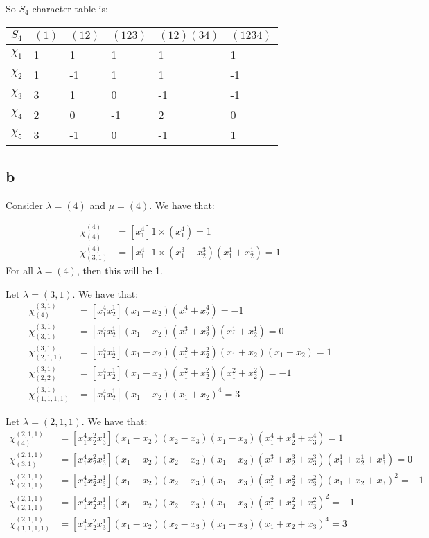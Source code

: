 \documentclass[]{article}
\begin{document}
So $S_4$ character table is:
\begin{table}[h!]
	\centering
	\begin{tabular}{|l|l|l|l|l|l|}
		\hline
		$S_4$    & $(1)$ & $(12)$ & $(123)$ & $(12)(34)$ & $(1234)$ \\ \hline
		$\chi_1$ & 1     & 1      & 1       & 1          & 1        \\ \hline
		$\chi_2$ & 1     & -1     & 1       & 1          & -1       \\ \hline
		$\chi_3$ & 3     & 1      & 0       & -1         & -1       \\ \hline
		$\chi_4$ & 2     & 0      & -1      & 2          & 0        \\ \hline
		$\chi_5$ & 3     & -1     & 0       & -1         & 1        \\ \hline
	\end{tabular}
\end{table}

\subsection*{b}
Consider $\lambda = (4)$ and $\mu = (4)$.
We have that:

\begin{align*}
	\chi^{(4)}_{(4)} &= [x_1^{4}] 1 \times (x_1^4) = 1\\
	\chi^{(4)}_{(3,1)} &= [x_1^{4}] 1 \times (x_1^3 + x_2^3)(x_1^1 + x_2^1) = 1
\end{align*}
For all $\lambda = (4)$, then this will be 1.

Let $\lambda = (3,1)$. We have that:
\begin{align*}
	\chi^{(3,1)}_{(4)} &= [x_1^4 x_2^1] (x_1 - x_2) (x_1^4 + x_2^4) = -1\\
	\chi^{(3,1)}_{(3,1)}&= [x_1^4 x_2^1] (x_1 - x_2) (x_1^3 + x_2^3)(x_1^1 + x_2^1) = 0\\
	\chi^{(3,1)}_{(2,1,1)}&= [x_1^4 x_2^1] (x_1 - x_2) (x_1^2 + x_2 ^2)(x_1 + x_2) (x_1 + x_2 ) = 1\\
	\chi^{(3,1)}_{(2,2)}&= [x_1^4 x_2^1] (x_1 - x_2) (x_1^2 + x_2 ^2)(x_1^2 + x_2^2 )  = -1\\
	\chi^{(3,1)}_{(1,1,1,1)}&= [x_1^4 x_2^1] (x_1 - x_2) (x_1 + x_2)^4 = 3
\end{align*}

Let $\lambda = (2,1,1)$. We have that:
\begin{align*}
	\chi^{(2,1,1)}_{(4)} &= [x_1^4 x_2^2 x_3^1](x_1 - x_2)(x_2 - x_3)(x_1 - x_3) (x_1^4 + x_2^4 + x_3^4) = 1
	\\
	\chi^{(2,1,1)}_{(3,1)} &= [x_1^4 x_2^2 x_3^1](x_1 - x_2)(x_2 - x_3)(x_1 - x_3) (x_1^3 + x_2^3 + x_3^3)(x_1^1 + x_2^1 + x_3^1) = 0\\
	\chi^{(2,1,1)}_{(2,1,1)} &= [x_1^4 x_2^2 x_3^1](x_1 - x_2)(x_2 - x_3)(x_1 - x_3) (x_1^2 + x_2^2 + x_3^2)(x_1 + x_2 + x_3)^2 = -1\\
	\chi^{(2,1,1)}_{(2,1,1)} &= [x_1^4 x_2^2 x_3^1](x_1 - x_2)(x_2 - x_3)(x_1 - x_3) (x_1^2 + x_2^2 + x_3^2)^2 = -1\\
	\chi^{(2,1,1)}_{(1,1,1,1)} &= [x_1^4 x_2^2 x_3^1](x_1 - x_2)(x_2 - x_3)(x_1 - x_3) (x_1 + x_2 + x_3)^4 = 3
\end{align*}
\end{document}
